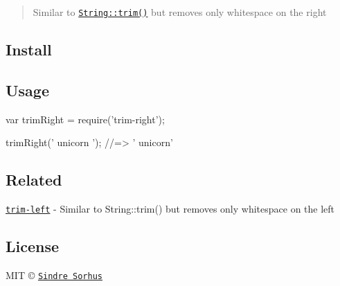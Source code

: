 \begin{quote}
Similar to \href{https://developer.mozilla.org/en-US/docs/Web/JavaScript/Reference/Global_Objects/String/Trim}{\tt {\ttfamily String\+::trim()}} but removes only whitespace on the right \end{quote}


\subsection*{Install}




\subsection*{Usage}


\begin{DoxyCode}
var trimRight = require('trim-right');

trimRight('  unicorn  ');
//=> '  unicorn'
\end{DoxyCode}


\subsection*{Related}


\begin{DoxyItemize}
\item \href{https://github.com/sindresorhus/trim-left}{\tt {\ttfamily trim-\/left}} -\/ Similar to {\ttfamily String\+::trim()} but removes only whitespace on the left
\end{DoxyItemize}

\subsection*{License}

M\+IT © \href{http://sindresorhus.com}{\tt Sindre Sorhus} 